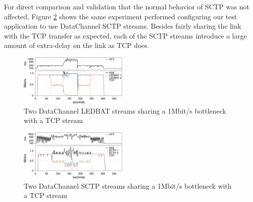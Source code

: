 \documentclass{sig-alternate}
\begin{document}

For direct comparison and validation that the normal behavior of SCTP was not affected,
Figure \ref{fig:2sctp_tcp} shows the same experiment performed configuring our test
application to use DataChannel SCTP streams. Besides fairly sharing the link with the TCP
transfer as expected, each of the SCTP streams introduce a large amount of extra-delay on
the link as TCP does.

\begin{figure}[t]
  \centering
    \includegraphics[width=0.47\textwidth]{figs/2ledbat_tcp}
\vspace*{-0.38cm}
	\caption{Two DataChannel LEDBAT streams sharing a 1Mbit/s bottleneck with a TCP stream} \label{fig:2ledbat_tcp}
\end{figure}

\begin{figure}[t]
  \centering
    \includegraphics[width=0.47\textwidth]{figs/2sctp_tcp}
\vspace*{-0.38cm}
	\caption{Two DataChannel SCTP  streams sharing a 1Mbit/s bottleneck with a TCP stream} \label{fig:2sctp_tcp}
\vspace*{-0.4cm}
\end{figure}



\end{document}
